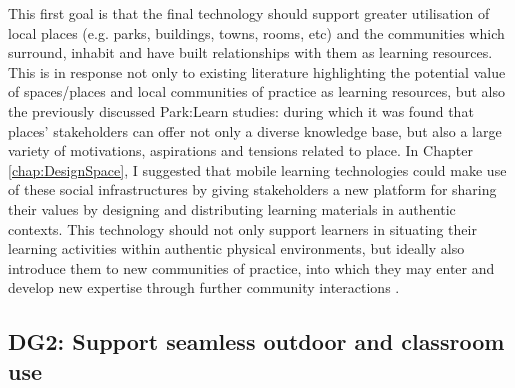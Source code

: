 This first goal is that the final technology should support greater utilisation of local places (e.g. parks, buildings, towns, rooms, etc) and the communities which surround, inhabit and have built relationships with them as learning resources. This is in response not only to existing literature highlighting the potential value of spaces/places \citep{Gryl2012, Frohberg2009} and local communities of practice \citep{Dodds2017, Leat2015} as learning resources, but also the previously discussed Park:Learn studies: during which it was found that places' stakeholders can offer not only a diverse knowledge base, but also a large variety of motivations, aspirations and tensions related to place. In Chapter \ref{chap:DesignSpace}, I suggested that mobile learning technologies could make use of these social infrastructures by giving stakeholders a new platform for sharing their values by designing and distributing learning materials in authentic contexts. This technology should not only support learners in situating their learning activities within authentic physical environments, but ideally also introduce them to new communities of practice, into which they may enter and develop new expertise through further community interactions \citep{lave1991situated}.

\subsection*{ DG2: Support seamless outdoor and classroom use }
\label{DG2}

